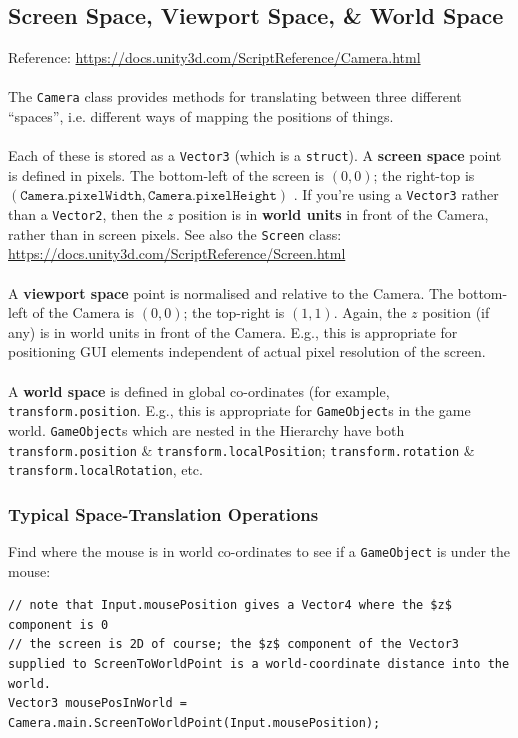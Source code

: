 \documentclass[a4paper,11pt]{article}
\begin{document}
\subsection{Screen Space, Viewport Space, \& World Space}
Reference: \url{https://docs.unity3d.com/ScriptReference/Camera.html}
\\\\
The \verb|Camera| class provides methods for translating between three different ``spaces'', i.e. different ways of 
mapping the positions of things. 
\\\\
Each of these is stored as a \verb|Vector3| (which is a \verb|struct|).
A \textbf{screen space} point is defined in pixels. 
The bottom-left of the screen is $(0,0)$; the right-top is $(\texttt{Camera.pixelWidth}, \texttt{Camera.pixelHeight})$ . 
If you're using a \verb|Vector3| rather than a \verb|Vector2|, then the $z$ position is in \textbf{world units} in front 
of the Camera, rather than in screen pixels.
See also the \verb|Screen| class: \url{https://docs.unity3d.com/ScriptReference/Screen.html}
\\\\ 
A \textbf{viewport space} point is normalised and relative to the Camera. 
The bottom-left of the Camera is $(0,0)$; the top-right is $(1,1)$.
Again, the $z$ position (if any) is in world units in front of the Camera.
E.g., this is appropriate for positioning GUI elements independent of actual pixel resolution of the screen.
\\\\ 
A \textbf{world space} is defined in global co-ordinates (for example, \verb|transform.position|. 
E.g., this is appropriate for \verb|GameObject|s in the game world. 
\verb|GameObject|s which are nested in the Hierarchy have both \verb|transform.position| \&
\verb|transform.localPosition|; \verb|transform.rotation| \& \verb|transform.localRotation|, etc.

\subsubsection{Typical Space-Translation Operations}
Find where the mouse is in world co-ordinates to see if a \verb|GameObject| is under the mouse:
\begin{verbatim}
// note that Input.mousePosition gives a Vector4 where the $z$ component is 0 
// the screen is 2D of course; the $z$ component of the Vector3 supplied to ScreenToWorldPoint is a world-coordinate distance into the world.
Vector3 mousePosInWorld = Camera.main.ScreenToWorldPoint(Input.mousePosition);
\end{verbatim}
\end{document}
